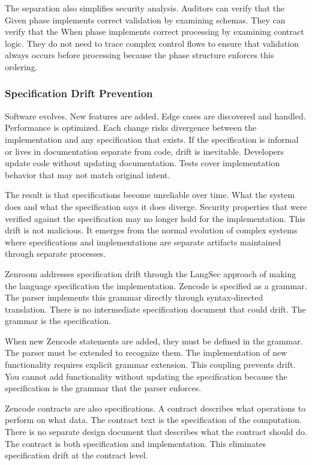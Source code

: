 The separation also simplifies security analysis. Auditors can verify
that the Given phase implements correct validation by examining
schemas. They can verify that the When phase implements correct
processing by examining contract logic. They do not need to trace
complex control flows to ensure that validation always occurs before
processing because the phase structure enforces this ordering.

\subsubsection{Specification Drift Prevention}

Software evolves. New features are added. Edge cases are discovered
and handled. Performance is optimized. Each change risks divergence
between the implementation and any specification that exists. If the
specification is informal or lives in documentation separate from
code, drift is inevitable. Developers update code without updating
documentation. Tests cover implementation behavior that may not match
original intent.

The result is that specifications become unreliable over time. What
the system does and what the specification says it does
diverge. Security properties that were verified against the
specification may no longer hold for the implementation. This drift is
not malicious. It emerges from the normal evolution of complex systems
where specifications and implementations are separate artifacts
maintained through separate processes.

Zenroom addresses specification drift through the LangSec approach of
making the language specification the implementation. Zencode is
specified as a grammar. The parser implements this grammar directly
through syntax-directed translation. There is no intermediate
specification document that could drift. The grammar is the
specification.

When new Zencode statements are added, they must be defined in the
grammar. The parser must be extended to recognize them. The
implementation of new functionality requires explicit grammar
extension. This coupling prevents drift. You cannot add functionality
without updating the specification because the specification is the
grammar that the parser enforces.

Zencode contracts are also specifications. A contract describes what
operations to perform on what data. The contract text is the
specification of the computation. There is no separate design document
that describes what the contract should do. The contract is both
specification and implementation. This eliminates specification drift
at the contract level.

